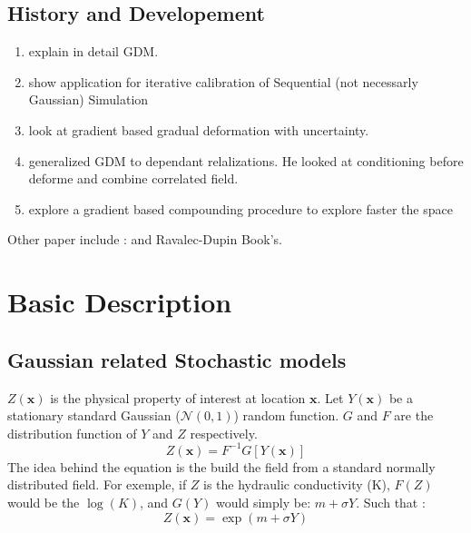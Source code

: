 \documentclass{article}
\begin{document}
\begin{multicols}{2}
\subsection{History and Developement}
\begin{enumerate}
\item \cite{Hu2000} explain in detail GDM.
\item \cite{Hu2001} show application for iterative calibration of Sequential (not necessarly Gaussian) Simulation
\item \cite{LeRavalec-Dupin2002} look at gradient based gradual deformation with uncertainty.
\item \cite{Hu2002} generalized GDM to dependant relalizations. He looked at conditioning before deforme and combine correlated field.
\item \cite{Hu2004} explore a gradient based compounding procedure to explore faster the space
\end{enumerate}
Other paper include : \cite{hu1998constraining, roggero1998gradual, LeRavalec2000} and Ravalec-Dupin Book's.



\section{Basic Description}
\subsection{Gaussian related Stochastic models}
$Z(\mathbf{x})$ is the physical property of interest at location $\mathbf{x}$. Let $Y(\mathbf{x})$ be a stationary standard Gaussian ($ \mathcal{N}(0,1)$) random function. $G$ and $F$ are the distribution function of $Y$ and $Z$ respectively. 
\[ Z(\mathbf{x}) = F^{-1}{G[Y(\mathbf{x})]} \]
The idea behind the equation is the build the field from a standard normally distributed field. For exemple, if $Z$ is the hydraulic conductivity (K), $F(Z)$ would be the $\log(K)$, and $G(Y)$ would simply be: $m + \sigma Y$. Such that : \[ Z(\mathbf{x}) = \exp(m + \sigma Y) \]


\end{multicols}
\end{document}
